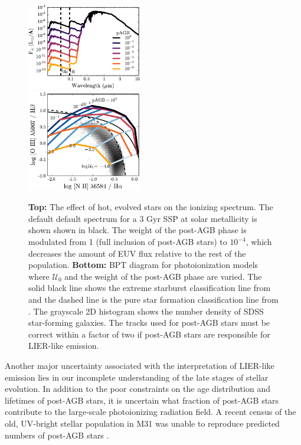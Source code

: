 \documentclass[linenumbers, trackchanges, tighten]{aastex61}%
\newcommand{\U}{\ensuremath{\mathcal{U}_{0}}}
\begin{document}
\begin{figure}[!htbp]
  \begin{centering}
    \includegraphics[width=0.45\textwidth]{f28a.pdf}\\
    \includegraphics[width=0.45\textwidth]{f28b.pdf}
    \caption{\textbf{Top:} The effect of hot, evolved stars on the ionizing spectrum. The default default spectrum for a 3 Gyr SSP at solar metallicity is shown shown in black. The weight of the post-AGB phase is modulated from 1 (full inclusion of post-AGB stars) to $10^{-4}$, which decreases the amount of EUV flux relative to the rest of the population. \textbf{Bottom:} BPT diagram for photoionization models where \U{} and the weight of the post-AGB phase are varied. The solid black line shows the extreme starburst classification line from \citet{Kewley01} and the dashed line is the pure star formation classification line from \citet{Kauffmann03a}. The grayscale 2D histogram shows the number density of SDSS star-forming galaxies. The \citet{Vassiliadis} tracks used for post-AGB stars must be correct within a factor of two if post-AGB stars are responsible for LIER-like emission.}
    \label{fig:hotstars}
  \end{centering}
\end{figure}

Another major uncertainty associated with the interpretation of LIER-like emission lies in our incomplete understanding of the late stages of stellar evolution. In addition to the poor constraints on the age distribution and lifetimes of post-AGB stars, it is uncertain what fraction of post-AGB stars contribute to the large-scale photoionizing radiation field. A recent census of the old, UV-bright stellar population in M31 was unable to reproduce predicted numbers of post-AGB stars \citep{Rosenfield12}. 
\end{document}
